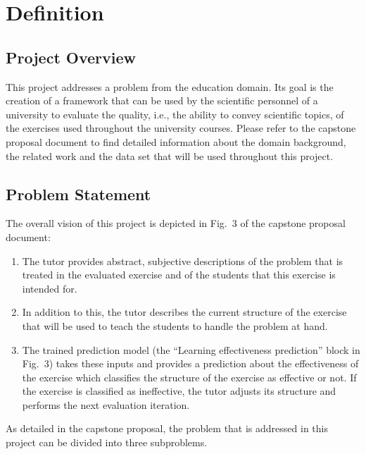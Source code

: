 \section{Definition}

\subsection{Project Overview}

This project addresses a problem from the education domain. Its goal is the creation of a framework that can be used by the scientific personnel of a university to evaluate the quality, i.e., the ability to convey scientific topics, of the exercises used throughout the university courses. Please refer to the capstone proposal document to find detailed information about the domain background, the related work and the data set that will be used throughout this project.

\subsection{Problem Statement}\label{la_problem_statement}

The overall vision of this project is depicted in Fig.~3 of the capstone proposal document:

\begin{enumerate}
	\item The tutor provides abstract, subjective descriptions of the problem that is treated in the evaluated exercise and of the students that this exercise is intended for.
	\item In addition to this, the tutor describes the current structure of the exercise that will be used to teach the students to handle the problem at hand.
	\item The trained prediction model (the “Learning effectiveness prediction” block in Fig.~3) takes these inputs and provides a prediction about the effectiveness of the exercise which classifies the structure of the exercise as effective or not. If the exercise is classified as ineffective, the tutor adjusts its structure and performs the next evaluation iteration.
\end{enumerate}

As detailed in the capstone proposal, the problem that is addressed in this project can be divided into three subproblems. 

